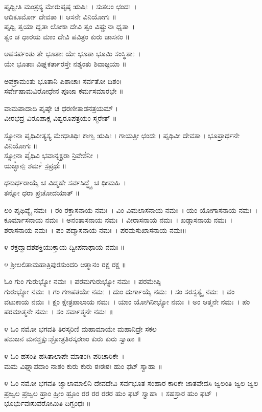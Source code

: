 ಪೃಥ್ವೀತಿ ಮಂತ್ರಸ್ಯ ಮೇರುಪೃಷ್ಠ ಋಷಿಃ~। ಸುತಲಂ ಛಂದಃ~।\\ಆದಿಕೂರ್ಮೋ ದೇವತಾ ॥ ಆಸನೇ ವಿನಿಯೋಗಃ ॥\\
ಪೃಥ್ವಿ ತ್ವಯಾ ಧೃತಾ ಲೋಕಾ ದೇವಿ ತ್ವಂ ವಿಷ್ಣುನಾ ಧೃತಾ~।\\
ತ್ವಂ ಚ ಧಾರಯ ಮಾಂ ದೇವಿ ಪವಿತ್ರಂ ಕುರು ಚಾಸನಂ ॥

ಅಪಸರ್ಪಂತು ತೇ ಭೂತಾಃ ಯೇ ಭೂತಾ ಭೂಮಿ ಸಂಸ್ಥಿತಾಃ~।\\
ಯೇ ಭೂತಾಃ ವಿಘ್ನಕರ್ತಾರಸ್ತೇ ನಶ್ಯಂತು ಶಿವಾಜ್ಞಯಾ ॥

ಅಪಕ್ರಾಮಂತು ಭೂತಾನಿ ಪಿಶಾಚಾಃ ಸರ್ವತೋ ದಿಶಂ।\\
ಸರ್ವೇಷಾಮವಿರೋಧೇನ ಪೂಜಾ ಕರ್ಮಸಮಾರಭೇ ॥

ವಾಮಪಾದಾದಿ ಪೃಷ್ಠೇ ಚ ಧರಣೀತಾಡನತ್ರಯಮ್ ।\\
ವೀರಭದ್ರ ವಿರೂಪಾಕ್ಷ ವಿಶ್ವರೂಪತ್ರಯಂ ಸ್ಮರೇತ್ ॥

ಸ್ಯೋನಾ ಪೃಥಿವೀತ್ಯಸ್ಯ ಮೇಧಾತಿಥಿಃ ಕಾಣ್ವ ಋಷಿಃ । ಗಾಯತ್ರೀ ಛಂದಃ । ಪೃಥಿವೀ ದೇವತಾ । ಭೂಪ್ರಾರ್ಥನೇ ವಿನಿಯೋಗಃ ॥\\
ಸ್ಯೋ॒ನಾ ಪೃ॑ಥಿವಿ ಭವಾನೃಕ್ಷ॒ರಾ ನಿ॒ವೇಶ॑ನೀ~।\\ ಯಚ್ಛಾ᳚ನಃ॒ ಶರ್ಮ॑ ಸ॒ಪ್ರಥಃ॑ ॥

ಧನುರ್ಧರಾಯೈ ಚ ವಿದ್ಮಹೇ ಸರ್ವಸಿದ್ಧ್ಯೈ ಚ ಧೀಮಹಿ~।\\ ತನ್ನೋ ಧರಾ ಪ್ರಚೋದಯಾತ್ ॥

ಲಂ ಪೃಥಿವ್ಯೈ ನಮಃ~। ರಂ ರಕ್ತಾಸನಾಯ ನಮಃ~। ವಿಂ ವಿಮಲಾಸನಾಯ ನಮಃ~। ಯಂ ಯೋಗಾಸನಾಯ ನಮಃ~। ಕೂರ್ಮಾಸನಾಯ ನಮಃ~। ಅನಂತಾಸನಾಯ ನಮಃ~। ವೀರಾಸನಾಯ ನಮಃ~। ಖಡ್ಗಾಸನಾಯ ನಮಃ~। ಶರಾಸನಾಯ ನಮಃ~। ಪಂ ಪದ್ಮಾಸನಾಯ ನಮಃ~। ಪರಮಸುಖಾಸನಾಯ ನಮಃ॥

೪ ರಕ್ತದ್ವಾದಶಶಕ್ತಿಯುಕ್ತಾಯ ದ್ವೀಪನಾಥಾಯ ನಮಃ ॥

೪ ಶ್ರೀಲಲಿತಾಮಹಾತ್ರಿಪುರಸುಂದರಿ ಆತ್ಮಾನಂ ರಕ್ಷ ರಕ್ಷ ॥

ಓಂ ಗುಂ ಗುರುಭ್ಯೋ ನಮಃ~। ಪರಮಗುರುಭ್ಯೋ ನಮಃ~। ಪರಮೇಷ್ಠಿ\\ಗುರುಭ್ಯೋ ನಮಃ~। ಗಂ ಗಣಪತಯೇ ನಮಃ~। ದುಂ ದುರ್ಗಾಯೈ ನಮಃ~। ಸಂ ಸರಸ್ವತ್ಯೈ ನಮಃ~। ವಂ ವಟುಕಾಯ ನಮಃ~। ಕ್ಷಂ ಕ್ಷೇತ್ರಪಾಲಾಯ ನಮಃ~। ಯಾಂ ಯೋಗಿನೀಭ್ಯೋ ನಮಃ~। ಅಂ ಆತ್ಮನೇ ನಮಃ~। ಪಂ ಪರಮಾತ್ಮನೇ ನಮಃ~। ಸಂ ಸರ್ವಾತ್ಮನೇ ನಮಃ ॥

೪ ಓಂ ನಮೋ ಭಗವತಿ ತಿರಸ್ಕರಿಣಿ ಮಹಾಮಾಯೇ ಮಹಾನಿದ್ರೇ ಸಕಲ \\ಪಶುಜನ ಮನಶ್ಚಕ್ಷುಃಶ್ರೋತ್ರತಿರಸ್ಕರಣಂ ಕುರು ಕುರು ಸ್ವಾಹಾ ॥

೪ ಓಂ ಹಸಂತಿ ಹಸಿತಾಲಾಪೇ ಮಾತಂಗಿ ಪರಿಚಾರಿಕೇ~।\\
ಮಮ ವಿಘ್ನಾಪದಾಂ ನಾಶಂ ಕುರು ಕುರು ಠಃಠಃಠಃ ಹುಂ ಫಟ್ ಸ್ವಾಹಾ ॥

೪ ಓಂ ನಮೋ ಭಗವತಿ ಜ್ವಾಲಾಮಾಲಿನಿ ದೇವದೇವಿ ಸರ್ವಭೂತ ಸಂಹಾರ ಕಾರಿಕೇ ಜಾತವೇದಸಿ ಜ್ವಲಂತಿ ಜ್ವಲ ಜ್ವಲ ಪ್ರಜ್ವಲ ಪ್ರಜ್ವಲ ಹ್ರಾಂ ಹ್ರೀಂ ಹ್ರೂಂ ರರ ರರ ರರರ ಹುಂ ಫಟ್ ಸ್ವಾಹಾ~। ಸಹಸ್ರಾರ ಹುಂ ಫಟ್~।\\ ಭೂರ್ಭುವಃಸುವರೋಮಿತಿ ದಿಗ್ಬಂಧಃ ॥


